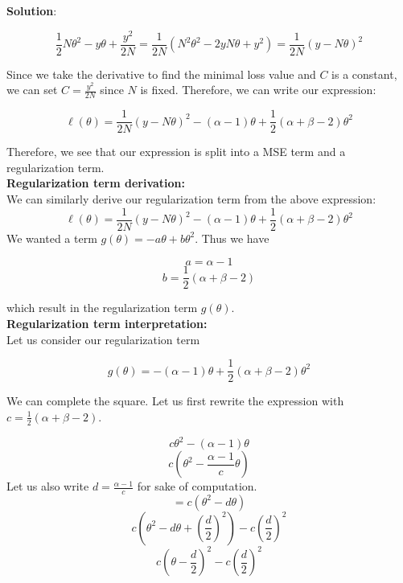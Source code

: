 \documentclass[submit]{../harvardml}
\newenvironment{answer}{
    \vspace{2mm}
    \color{blue}\noindent\textbf{Solution}:
}{}
\begin{document}
\begin{answer}
\begin{enumerate}
\begin{enumerate}
            \[
            \frac{1}{2}N\theta^2 - y\theta + \frac{y^2}{2N} = \frac{1}{2N}(N^2\theta^2 - 2yN\theta + y^2) = \frac{1}{2N}(y - N\theta)^2
            \]

            Since we take the derivative to find the minimal loss value and $C$ is a constant, we can set $C=\frac{y^2}{2N}$ since $N$ is fixed. Therefore, we can write our expression:

            \[
            \ell(\theta) = \frac{1}{2N}(y - N\theta)^2 - (\alpha - 1)\theta + \frac{1}{2}(\alpha + \beta - 2)\theta^2
            \]

            Therefore, we see that our expression is split into a MSE term and a regularization term.\\              
              

              \textbf{Regularization term derivation:}\\

              We can similarly derive our regularization term from the above expression:
            \[
                \ell(\theta) = \frac{1}{2N}(y - N\theta)^2 - (\alpha - 1)\theta + \frac{1}{2}(\alpha + \beta - 2)\theta^2
            \]
              We wanted a term $g(\theta) = -a \theta + b \theta^2$. Thus we have

              \[
              a = \alpha - 1
              \]
              \[
              b = \frac{1}{2}(\alpha + \beta - 2)
              \]

              which result in the regularization term $g(\theta)$. \\

              \textbf{Regularization term interpretation:}\\

              Let us consider our regularization term

              \[
              g(\theta) = -(\alpha - 1)\theta + \frac{1}{2}(\alpha + \beta - 2)\theta^2
              \]

              We can complete the square. Let us first rewrite the expression with $c = \frac{1}{2}(\alpha + \beta - 2)$.

              \[
              c\theta^2 - (\alpha - 1)\theta
              \]
              \[
              c\left(\theta^2 - \frac{\alpha - 1}{c}\theta\right)
              \]
              Let us also write $d = \frac{\alpha - 1}{c}$ for sake of computation.
              \[
              = c(\theta^2 - d\theta)
              \]
              \[
              c\left(\theta^2-d\theta+\left(\frac{d}{2}\right)^2\right) - c\left(\frac{d}{2}\right)^2
              \]
              \[
              c\left(\theta - \frac{d}{2}\right)^2 - c\left(\frac{d}{2}\right)^2
              \]


\end{enumerate}
\end{enumerate}
\end{answer}
\end{document}
